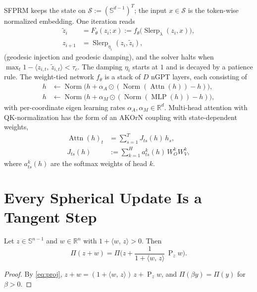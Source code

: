 \documentclass{article}
\theoremstyle{plain}
\theoremstyle{definition}
\theoremstyle{remark}
\newcommand{\R}{\mathbb{R}}
\newcommand{\Sph}{\mathbb{S}}
\newcommand{\ip}[2]{\langle #1,\, #2\rangle}
\newcommand{\Proj}{\operatorname{P}}
\newcommand{\Norm}{\operatorname{Norm}}
\newcommand{\Ret}{\Pi}
\newcommand{\Slerp}{\operatorname{Slerp}}
\newcommand{\Attn}{\operatorname{Attn}}
\newcommand{\MLP}{\operatorname{MLP}}
\begin{document}
SFPRM \citep{sfprm} keeps the state on $\mathcal S:=(\Sph^{d-1})^T$; the input $x\in\mathcal S$ is
the token-wise normalized embedding. One iteration reads
\begin{align}
  \tilde z_i &= F_\theta(z_i;x) := f_\theta\big(\Slerp_\lambda(z_i,x)\big), \label{eq:sfprm-inject}\\
  z_{i+1} &= \Slerp_{\eta_i}(z_i,\tilde z_i), \label{eq:sfprm-damp}
\end{align}
(geodesic injection and geodesic damping), and the solver halts when
$\max_t 1-\ip{z_{i,t}}{\tilde z_{i,t}}<\tau_c$. The damping $\eta_i$ starts at $1$ and is decayed by a
patience rule. The weight-tied network $f_\theta$ is a stack of $D$ nGPT layers, each consisting of
\begin{align}
  h &\leftarrow \Norm\big(h + \alpha_A\odot(\Norm(\Attn(h)) - h)\big),\label{eq:ngpt-attn}\\
  h &\leftarrow \Norm\big(h + \alpha_M\odot(\Norm(\MLP(h)) - h)\big),\label{eq:ngpt-mlp}
\end{align}
with per-coordinate eigen learning rates $\alpha_A,\alpha_M\in\R^d$. Multi-head attention with
QK-normalization has the form of an AKOrN coupling with state-dependent weights,
\begin{equation}
  \begin{split}
  \Attn(h)_t &= \textstyle\sum_{s=1}^T J_{ts}(h)\,h_s,\\
  J_{ts}(h) &:= \textstyle\sum_{k=1}^{H} a^{k}_{ts}(h)\,W_O^{k} W_V^{k},
  \end{split}
  \label{eq:attn-as-coupling}
\end{equation}
where $a^k_{ts}(h)$ are the softmax weights of head $k$.

\section{Every Spherical Update Is a Tangent Step}
\label{sec:lemmas}

\begin{lemma}
\label{lem:renorm}
Let $z\in\Sph^{n-1}$ and $w\in\R^n$ with $1+\ip{w}{z}>0$. Then
\begin{equation}
  \Ret(z+w) = \Ret\Big(z + \frac{1}{1+\ip{w}{z}}\,\Proj_z w\Big).
\end{equation}
\end{lemma}
\begin{proof}
By \eqref{eq:proj}, $z+w=(1+\ip{w}{z})\,z+\Proj_z w$, and $\Ret(\beta y)=\Ret(y)$ for $\beta>0$.
\end{proof}
\end{document}
